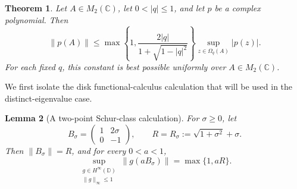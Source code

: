 \documentclass[11pt]{article}
\newtheorem{theorem}{Theorem}[section]
\newtheorem{lemma}[theorem]{Lemma}
\theoremstyle{remark}
\begin{document}
\begin{theorem}
\label{thm:q-two-by-two}
Let \(A\in M_2(\mathbb C)\), let \(0<|q|\leq 1\), and let \(p\) be a
complex polynomial.  Then
\[
  \|p(A)\|
  \leq
  \max\left\{1,
       \frac{2|q|}{1+\sqrt{1-|q|^{2}}}\right\}
  \sup_{z\in\Omega_q(A)}|p(z)|.
\]
For each fixed \(q\), this constant is best possible uniformly over
\(A\in M_2(\mathbb C)\).
\end{theorem}

We first isolate the disk functional-calculus calculation that will be
used in the distinct-eigenvalue case.

\begin{lemma}[A two-point Schur-class calculation]
\label{lem:two-point-schur}
For \(\sigma\geq 0\), let
\[
  B_\sigma=
  \begin{pmatrix}
    1&2\sigma\\
    0&-1
  \end{pmatrix},
  \qquad
  R=R_\sigma:=\sqrt{1+\sigma^{2}}+\sigma.
\]
Then \(\|B_\sigma\|=R\), and for every \(0<a<1\),
\[
  \sup_{\substack{g\in H^\infty(\mathbb D)\\
                  \|g\|_\infty\leq 1}}
       \|g(aB_\sigma)\|
  =\max\{1,aR\}.
\]
\end{lemma}
\end{document}
